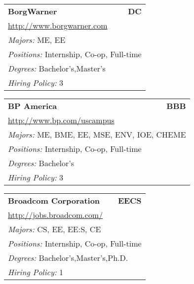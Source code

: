 \documentclass[twoside]{article}
\begin{document}
\begin{center}
\begin{multicols}{3}
\begin{FlushLeft}
\begin{minipage}{.9\columnwidth}\begin{tabularx}{.95\columnwidth}{Xr}
                 {\Large\bf BorgWarner} & {\Large\bf DC}\\
    \multicolumn{2}{p{.95\columnwidth}}{\url{http://www.borgwarner.com}}\\
    \multicolumn{2}{p{.95\columnwidth}}{\emph{Majors:} ME, EE}\\
    \multicolumn{2}{p{.95\columnwidth}}{\emph{Positions:} Internship, Co-op, Full-time}\\
    \multicolumn{2}{p{.95\columnwidth}}{\emph{Degrees:} Bachelor's,Master's}\\
    \multicolumn{2}{p{.95\columnwidth}}{\emph{Hiring Policy:} 3}\\
    \end{tabularx}
    
\end{minipage}
 
\begin{minipage}{.9\columnwidth}\begin{tabularx}{.95\columnwidth}{Xr}
                 {\Large\bf BP America} & {\Large\bf BBB}\\
    \multicolumn{2}{p{.95\columnwidth}}{\url{http://www.bp.com/uscampus}}\\
    \multicolumn{2}{p{.95\columnwidth}}{\emph{Majors:} ME, BME, EE, MSE, ENV, IOE, CHEME}\\
    \multicolumn{2}{p{.95\columnwidth}}{\emph{Positions:} Internship, Co-op, Full-time}\\
    \multicolumn{2}{p{.95\columnwidth}}{\emph{Degrees:} Bachelor's}\\
    \multicolumn{2}{p{.95\columnwidth}}{\emph{Hiring Policy:} 3}\\
    \end{tabularx}
    
\end{minipage}
 
\begin{minipage}{.9\columnwidth}\begin{tabularx}{.95\columnwidth}{Xr}
                 {\Large\bf Broadcom Corporation} & {\Large\bf EECS}\\
    \multicolumn{2}{p{.95\columnwidth}}{\url{http://jobs.broadcom.com/}}\\
    \multicolumn{2}{p{.95\columnwidth}}{\emph{Majors:} CS, EE, EE:S, CE}\\
    \multicolumn{2}{p{.95\columnwidth}}{\emph{Positions:} Internship, Co-op, Full-time}\\
    \multicolumn{2}{p{.95\columnwidth}}{\emph{Degrees:} Bachelor's,Master's,Ph.D.}\\
    \multicolumn{2}{p{.95\columnwidth}}{\emph{Hiring Policy:} 1}\\
    \end{tabularx}
    

\end{minipage}
\end{FlushLeft}
\end{multicols}
\end{center}
\end{document}
